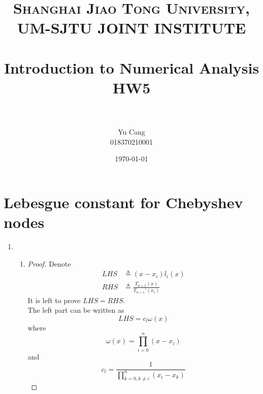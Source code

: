 \documentclass[paper=a4, fontsize=11pt]{scrartcl} %
\title{	
\normalfont \normalsize 
\textsc{Shanghai Jiao Tong University, UM-SJTU JOINT INSTITUTE} \\ [25pt] %
\horrule{0.5pt} \\[0.4cm] %
\huge Introduction to Numerical Analysis \\ HW5 \\ %
\horrule{2pt} \\[0.5cm] %
}
\author{Yu Cang \\ 018370210001} %
\date{\normalsize \today} %
\numberwithin{equation}{section} %
\numberwithin{figure}{section} %
\numberwithin{table}{section} %
\begin{document}
\maketitle %

\section{Lebesgue constant for Chebyshev nodes}
\begin{enumerate}
	\item 
		\begin{enumerate}
			\item 
				\begin{proof}
					Denote
					\begin{equation}
						\begin{aligned}
							LHS &\triangleq (x-x_i)l_i(x) \\
							RHS &\triangleq \frac{T_{n+1}(x)}{T_{n+1}'(x_i)}
						\end{aligned}
					\end{equation}
					It is left to prove $LHS = RHS$.\\
					The left part can be written as
					\begin{equation}
						LHS = c_l \omega(x)
					\end{equation}
					where 
					\begin{equation}
						\omega(x) = \prod_{i=0}^{n}(x-x_i)
					\end{equation}
					and
					\begin{equation}
						c_l = \frac{1}{\prod_{k=0, k\neq i}^{n}(x_i - x_k)} 
					\end{equation}


\end{proof}
\end{enumerate}
\end{enumerate}
\end{document}
